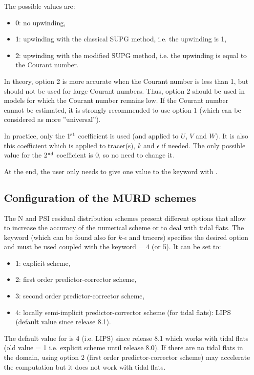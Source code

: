 The possible values are:

\begin{itemize}
\item 0: no upwinding,

\item 1: upwinding with the classical SUPG method, i.e. the upwinding is 1,

\item 2: upwinding with the modified SUPG method, i.e. the upwinding is equal
to the Courant number.
\end{itemize}

In theory, option 2 is more accurate when the Courant number is less than 1,
but should not be used for large Courant numbers.
Thus, option 2 should be used in models for which the Courant number remains low.
If the Courant number cannot be estimated, it is strongly recommended
to use option 1 (which can be considered as more ''universal'').

In practice, only the 1$^{\rm{st}}$ coefficient is used
(and applied to $U$, $V$ and $W$).
It is also this coefficient which is applied to tracer(s), $k$ and $\epsilon$
if needed.
The only possible value for the 2$^{\rm{nd}}$ coefficient is 0,
so no need to change it.

At the end, the user only needs to give one value to the keyword
 with .

\subsection{Configuration of the MURD schemes}
\label{sec:MURD}
The N and PSI residual distribution schemes present different options that allow
to increase the accuracy of the numerical scheme or to deal with tidal flats.
The keyword  (which can be
found also for $k$-$\epsilon$ and tracers) specifies the desired option and must
be used coupled with the keyword
 = 4 (or 5).
It can be set to:
\begin{itemize}
 \item 1: explicit scheme,
 \item 2: first order predictor-corrector scheme,
 \item 3: second order predictor-corrector scheme,
 \item 4: locally semi-implicit predictor-corrector scheme
(for tidal flats): LIPS (default value since release 8.1).
\end{itemize}
The default value for  is
4 (i.e. LIPS) since release 8.1 which works with tidal flats (old value = 1
i.e. explicit scheme until release 8.0).
If there are no tidal flats in the domain, using option 2 (first order
predictor-corrector scheme) may accelerate the computation but it does not
work with tidal flats.

